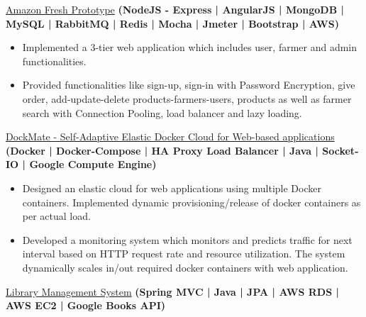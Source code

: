 \documentclass[10pt,a4paper]{article}
\begin{document}
{{{\spacedhrule{0.0em}{-0.4em}






\headedsection  %
  {\href{https://github.com/darshilsaraiya/Amazon}{Amazon Fresh Prototype}
  \textbf{
  \small{(NodeJS - Express | AngularJS | MongoDB | MySQL | RabbitMQ | Redis | Mocha | Jmeter | Bootstrap | AWS)}}}
  {} {%
  
    {\bodytext
    {
    \begin{itemize}
        \item Implemented a 3-tier web application which includes user, farmer and admin functionalities.
        \item Provided functionalities like sign-up, sign-in with Password Encryption, give order, add-update-delete products-farmers-users, products as well as farmer search with Connection Pooling, load balancer and lazy loading.
    \end{itemize}}}
}

\headedsection  %
  {\href{https://github.com/darshilsaraiya/dockmate}{DockMate - Self-Adaptive Elastic Docker Cloud for Web-based applications}
  \textbf{
  \small{(Docker | Docker-Compose | HA Proxy Load Balancer | Java | Socket-IO | Google Compute Engine)}}}
  {} {%
  
    {\bodytext
    {
    \begin{itemize}
        \item Designed an elastic cloud for web applications using multiple Docker containers. Implemented dynamic provisioning/release of docker containers as per actual load.
        \item Developed a monitoring system which monitors and predicts traffic for next interval based on HTTP request rate and resource utilization. The system dynamically scales in/out required docker containers with web application.
    \end{itemize}}}
}


\headedsection  %
  {\href{https://github.com/darshilsaraiya/LibraryManagementSystem}{Library Management System}
  \textbf{
  \small{(Spring MVC | Java | JPA | AWS RDS | AWS EC2 | Google Books API)}}}
  {} {%
  
}}}}
\end{document}
